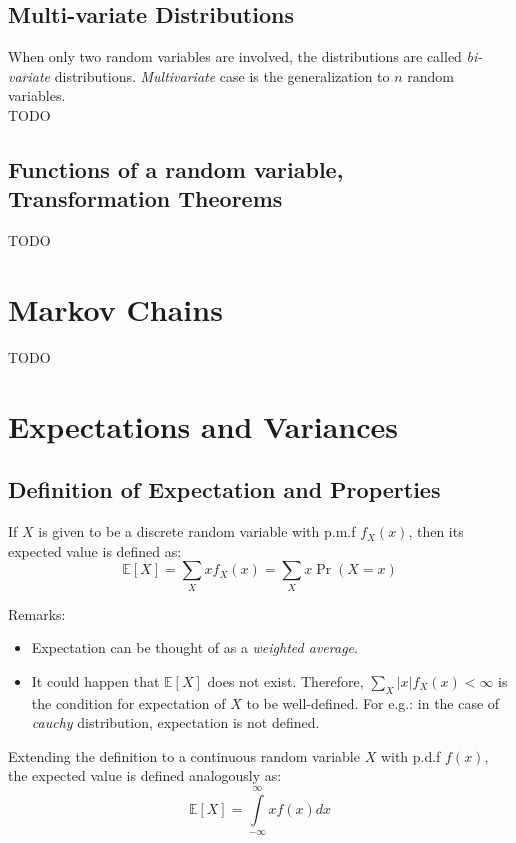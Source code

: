 \documentclass[english, 11pt]{article}
\begin{document}
\subsection{Multi-variate Distributions}
When only two random variables are involved, the distributions are called {\it bi-variate} distributions. {\it Multivariate} case is the generalization to $n$ random variables. \\
TODO

\subsection{Functions of a random variable, Transformation Theorems}
TODO


\newpage

\section{Markov Chains}
TODO

\section{Expectations and Variances}

\subsection{Definition of Expectation and Properties}
If $X$ is given to be a discrete random variable with p.m.f $f_X (x)$, then its expected value is defined as:
\[ \mathbb{E} [X] = \sum_{X} x f_X (x) = \sum_{X} x \Pr(X = x) \]

Remarks:
\begin{itemize} 
\item Expectation can be thought of as a {\it weighted average}.
\item It could happen that $\mathbb{E}[X]$ does not exist. Therefore, $\sum_{X} |x| f_X (x) < \infty $ is the condition for expectation of $X$ to be well-defined. For e.g.: in the case of {\it cauchy} distribution, expectation is not defined.
\end{itemize}

Extending the definition to a continuous random variable $X$ with p.d.f $f(x)$, the expected value is defined analogously as:
\[ \mathbb{E} [X] = \int\limits_{-\infty}^{\infty} x f(x) dx \]
\end{document}
